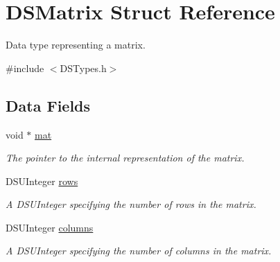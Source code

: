 \hypertarget{struct_d_s_matrix}{
\section{DSMatrix Struct Reference}
\label{struct_d_s_matrix}
}


Data type representing a matrix.  




{\ttfamily \#include $<$DSTypes.h$>$}

\subsection*{Data Fields}
\begin{DoxyCompactItemize}
\item 
\hypertarget{struct_d_s_matrix_a98815eee0ec0d8a86f2632f922df6e36}{
void $\ast$ \hyperlink{struct_d_s_matrix_a98815eee0ec0d8a86f2632f922df6e36}{mat}}
\label{struct_d_s_matrix_a98815eee0ec0d8a86f2632f922df6e36}

\begin{DoxyCompactList}\small\item\em The pointer to the internal representation of the matrix. \item\end{DoxyCompactList}\item 
\hypertarget{struct_d_s_matrix_abc69b7682293d99094ac37ed894a0249}{
DSUInteger \hyperlink{struct_d_s_matrix_abc69b7682293d99094ac37ed894a0249}{rows}}
\label{struct_d_s_matrix_abc69b7682293d99094ac37ed894a0249}

\begin{DoxyCompactList}\small\item\em A DSUInteger specifying the number of rows in the matrix. \item\end{DoxyCompactList}\item 
\hypertarget{struct_d_s_matrix_afb99a05f6e779cf7c631393281dddda9}{
DSUInteger \hyperlink{struct_d_s_matrix_afb99a05f6e779cf7c631393281dddda9}{columns}}
\label{struct_d_s_matrix_afb99a05f6e779cf7c631393281dddda9}

\begin{DoxyCompactList}\small\item\em A DSUInteger specifying the number of columns in the matrix. \item\end{DoxyCompactList}\end{DoxyCompactItemize}


